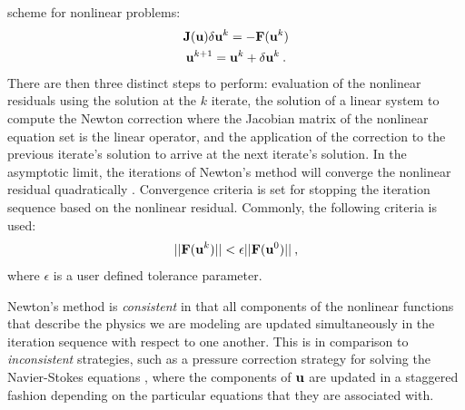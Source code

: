 scheme for nonlinear problems:
\begin{subequations}
  \begin{gather}
    \mathbf{J}(\mathbf{u}) \delta \mathbf{u}^k = -\mathbf{F}(\mathbf{u}^{k})\\
    \mathbf{u}^{k+1} = \mathbf{u}^k + \delta \mathbf{u}^k\:.
  \end{gather}
  \label{eq:newton_iteration}
\end{subequations}
There are then three distinct steps to perform: evaluation of the
nonlinear residuals using the solution at the $k$ iterate, the
solution of a linear system to compute the Newton correction where the
Jacobian matrix of the nonlinear equation set is the linear operator,
and the application of the correction to the previous iterate's
solution to arrive at the next iterate's solution. In the asymptotic
limit, the iterations of Newton's method will converge the nonlinear
residual quadratically \citep{kelley_iterative_1995}. Convergence
criteria is set for stopping the iteration sequence based on the
nonlinear residual. Commonly, the following criteria is used:
\begin{equation}
  ||\mathbf{F}(\mathbf{u}^{k})|| < \epsilon ||\mathbf{F}(\mathbf{u}^{0})||\:,
  \label{eq:newton_stopping_criteria}
\end{equation}
where $\epsilon$ is a user defined tolerance parameter. 

Newton's method is \textit{consistent} in that all components of the
nonlinear functions that describe the physics we are modeling are
updated simultaneously in the iteration sequence with respect to one
another. This is in comparison to \textit{inconsistent} strategies,
such as a pressure correction strategy for solving the Navier-Stokes
equations \citep{pletcher_computational_1997}, where the components of
$\mathbf{u}$ are updated in a staggered fashion depending on the
particular equations that they are associated with.

